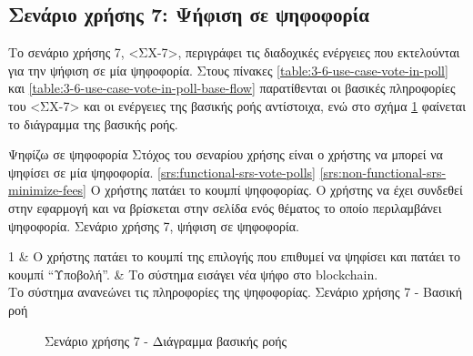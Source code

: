 \subsection{Σενάριο χρήσης 7: Ψήφιση σε ψηφοφορία} \label{subsection:3-6-use-case-vote-in-poll}

Το σενάριο χρήσης 7, <ΣΧ-7>, περιγράφει τις διαδοχικές ενέργειες που εκτελούνται για την ψήφιση σε μία ψηφοφορία. Στους πίνακες \ref{table:3-6-use-case-vote-in-poll} και \ref{table:3-6-use-case-vote-in-poll-base-flow} παρατίθενται οι βασικές πληροφορίες του <ΣΧ-7> και οι ενέργειες της βασικής ροής αντίστοιχα, ενώ στο σχήμα \ref{figure:3-6-use-case-vote-in-poll-base-flow-sequence-diagram} φαίνεται το διάγραμμα της βασικής ροής.

\useCaseTable
{Ψηφίζω σε ψηφοφορία}
{Στόχος του σεναρίου χρήσης είναι ο χρήστης να μπορεί να ψηφίσει σε μία ψηφοφορία.}
{\ref{srs:functional-srs-vote-polls}}
{\ref{srs:non-functional-srs-minimize-fees}}
{Ο χρήστης πατάει το κουμπί ψηφοφορίας.}
{Ο χρήστης να έχει συνδεθεί στην εφαρμογή και να βρίσκεται στην σελίδα ενός θέματος το οποίο περιλαμβάνει ψηφοφορία.}
{Σενάριο χρήσης 7, ψήφιση σε ψηφοφορία.}
{\label{table:3-6-use-case-vote-in-poll}}


\useCaseBaseFlowTable
{
    1 & Ο χρήστης πατάει το κουμπί της επιλογής που επιθυμεί να ψηφίσει και πατάει το κουμπί ``Υποβολή''. & Το σύστημα εισάγει νέα ψήφο στο blockchain. \\ [0.5ex]
}
{Το σύστημα ανανεώνει τις πληροφορίες της ψηφοφορίας.}
{Σενάριο χρήσης 7 - Βασική ροή}
{\label{table:3-6-use-case-vote-in-poll-base-flow}}

\begin{figure}[H]
    \centering
    
    \caption{Σενάριο χρήσης 7 - Διάγραμμα βασικής ροής}
    \label{figure:3-6-use-case-vote-in-poll-base-flow-sequence-diagram}
\end{figure}
